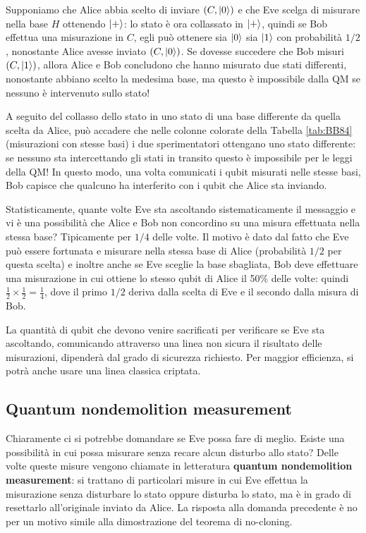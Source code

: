 \begin{esempio}
    Supponiamo che Alice abbia scelto di inviare $(C, \ket{0})$ e che Eve scelga di misurare nella base $H$ ottenendo $\ket{+}$: lo stato è ora collassato in $\ket{+}$, quindi se Bob effettua una misurazione in $C$, egli può ottenere sia $\ket{0}$ sia $\ket{1}$ con probabilità $1/2$, nonostante Alice avesse inviato $(C, \ket{0})$. Se dovesse succedere che Bob misuri $(C,\ket{1})$, allora Alice e Bob concludono che hanno misurato due stati differenti, nonostante abbiano scelto la medesima base, ma questo è impossibile dalla QM se nessuno è intervenuto sullo stato!
\end{esempio}

\noindent A seguito del collasso dello stato in uno stato di una base differente da quella scelta da Alice, può accadere che nelle colonne colorate della Tabella \ref{tab:BB84} (misurazioni con stesse basi) i due sperimentatori ottengano uno stato differente: se nessuno sta intercettando gli stati in transito questo è impossibile per le leggi della QM! In questo modo, una volta comunicati i qubit misurati nelle stesse basi, Bob capisce che qualcuno ha interferito con i qubit che Alice sta inviando. 

\noindent Statisticamente, quante volte Eve sta ascoltando sistematicamente il messaggio e vi è una possibilità che Alice e Bob non concordino su una misura effettuata nella stessa base? Tipicamente per $1/4$ delle volte. Il motivo è dato dal fatto che Eve può essere fortunata e misurare nella stessa base di Alice (probabilità $1/2$ per questa scelta) e inoltre anche se Eve sceglie la base sbagliata, Bob deve effettuare una misurazione in cui ottiene lo stesso qubit di Alice il 50\% delle volte: quindi $\frac{1}{2} \times \frac{1}{2} = \frac{1}{4}$, dove il primo $1/2$ deriva dalla scelta di Eve e il secondo dalla misura di Bob.  

\noindent La quantit\`a di qubit che devono venire sacrificati per verificare se Eve sta ascoltando, comunicando attraverso una linea non sicura il risultato delle misurazioni,  dipender\`a dal grado di sicurezza richiesto. Per maggior efficienza, si potr\`a anche usare una linea classica criptata.   

\subsection{Quantum nondemolition measurement}
Chiaramente ci si potrebbe domandare se Eve possa fare di meglio. Esiste una possibilità in cui possa misurare senza recare alcun disturbo allo stato? Delle volte queste misure vengono chiamate in letteratura \textbf{quantum nondemolition measurement}: si trattano di particolari misure in cui Eve effettua la misurazione senza disturbare lo stato oppure disturba lo stato, ma è in grado di resettarlo all'originale inviato da Alice. La risposta alla domanda precedente è no per un motivo simile alla dimostrazione del teorema di no-cloning.


